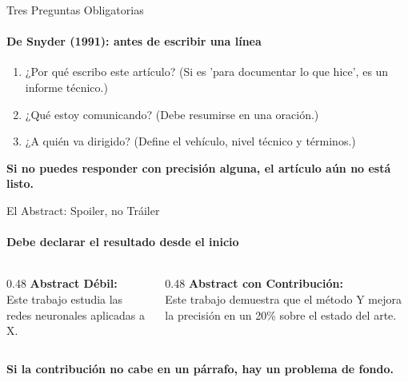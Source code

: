 \documentclass[aspectratio=169, 12pt]{beamer}
\begin{document}
\begin{frame}{Tres Preguntas Obligatorias}
  \framesubtitle{De Snyder (1991): antes de escribir una línea}
  \vspace{-2pt}

  \begin{enumerate}
    \item ¿Por qué escribo este artículo? (Si es 'para documentar lo que hice', es un informe técnico.)
    \item ¿Qué estoy comunicando? (Debe resumirse en una oración.)
    \item ¿A quién va dirigido? (Define el vehículo, nivel técnico y términos.)
  \end{enumerate}

  \vspace{0.5cm}
  {\color{Ember}\sffamily\bfseries Si no puedes responder con precisión alguna, el artículo aún no está listo.}
\end{frame}

\begin{frame}{El Abstract: Spoiler, no Tráiler}
  \framesubtitle{Debe declarar el resultado desde el inicio}
  \vspace{-2pt}

  \begin{columns}[T]
    \begin{column}{0.48\textwidth}
      {\color{Smoke}\sffamily\small\bfseries Abstract Débil:}\\[2pt]
      {\color{Cloud}\sffamily Este trabajo estudia las redes neuronales aplicadas a X.}
    \end{column}
    \hfill
    \begin{column}{0.48\textwidth}
      {\color{Gold}\sffamily\small\bfseries Abstract con Contribución:}\\[2pt]
      {\color{Cloud}\sffamily Este trabajo demuestra que el método Y mejora la precisión en un 20\% sobre el estado del arte.}
    \end{column}
  \end{columns}

  \vspace{0.5cm}
  {\color{OffWhite}\rmfamily\bfseries Si la contribución no cabe en un párrafo, hay un problema de fondo.}
\end{frame}
\end{document}
